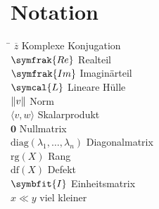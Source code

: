 \chapter*{Notation}
\begin{tabbing}
    \hspace{4cm} \= \kill
    \(\overline{z}\) \>  Komplexe Konjugation \\
    \(\symfrak{Re}\) \>  Realteil \\
    \(\symfrak{Im}\) \>  Imaginärteil \\
    \(\symcal{L}\)   \>  Lineare Hülle \\ 
    \(\lVert v\rVert\)     \>  Norm \\ 
    \(\langle v,w \rangle\) \> Skalarprodukt \\
    \(\symbf{0}\) \> Nullmatrix \\
    \(\text{diag}(\lambda_1,\ldots,\lambda_n)\) \> Diagonalmatrix \\
    \(\text{rg}(X)\) \> Rang \\
    \(\text{df}(X)\) \> Defekt \\
    \(\symbfit{I}\) \> Einheitsmatrix \\
    \(x \ll y\) \> viel kleiner \\
\end{tabbing}